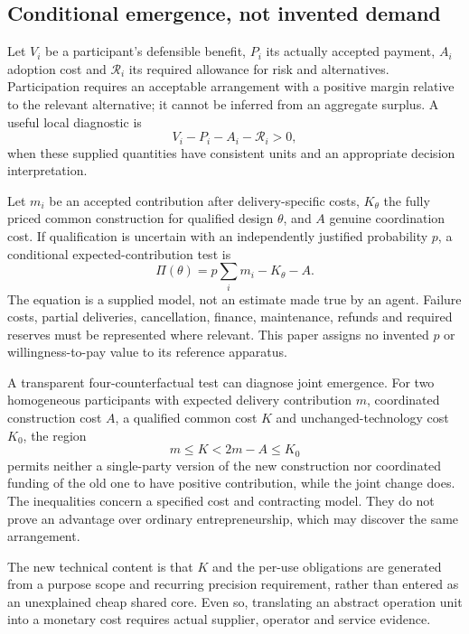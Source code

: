 \documentclass[11pt,letterpaper]{article}
\theoremstyle{definition}\newtheorem{definition}[theorem]{Definition}
\theoremstyle{remark}\newtheorem{remark}[theorem]{Remark}
\begin{document}
\subsection{Conditional emergence, not invented demand}
Let $V_i$ be a participant's defensible benefit, $P_i$ its actually accepted payment, $A_i$ adoption cost and $\mathcal R_i$ its required allowance for risk and alternatives. Participation requires an acceptable arrangement with a positive margin relative to the relevant alternative; it cannot be inferred from an aggregate surplus. A useful local diagnostic is
\begin{equation}
 V_i-P_i-A_i-\mathcal R_i>0,
 \label{eq:participation}
\end{equation}
when these supplied quantities have consistent units and an appropriate decision interpretation.

Let $m_i$ be an accepted contribution after delivery-specific costs, $K_\theta$ the fully priced common construction for qualified design $\theta$, and $A$ genuine coordination cost. If qualification is uncertain with an independently justified probability $p$, a conditional expected-contribution test is
\begin{equation}
 \Pi(\theta)=p\sum_i m_i-K_\theta-A.
 \label{eq:profit}
\end{equation}
The equation is a supplied model, not an estimate made true by an agent. Failure costs, partial deliveries, cancellation, finance, maintenance, refunds and required reserves must be represented where relevant. This paper assigns no invented $p$ or willingness-to-pay value to its reference apparatus.

A transparent four-counterfactual test can diagnose joint emergence. For two homogeneous participants with expected delivery contribution $m$, coordinated construction cost $A$, a qualified common cost $K$ and unchanged-technology cost $K_0$, the region
\begin{equation}
 m\leq K<2m-A\leq K_0
 \label{eq:joint}
\end{equation}
permits neither a single-party version of the new construction nor coordinated funding of the old one to have positive contribution, while the joint change does. The inequalities concern a specified cost and contracting model. They do not prove an advantage over ordinary entrepreneurship, which may discover the same arrangement.

The new technical content is that $K$ and the per-use obligations are generated from a purpose scope and recurring precision requirement, rather than entered as an unexplained cheap shared core. Even so, translating an abstract operation unit into a monetary cost requires actual supplier, operator and service evidence.
\end{document}
